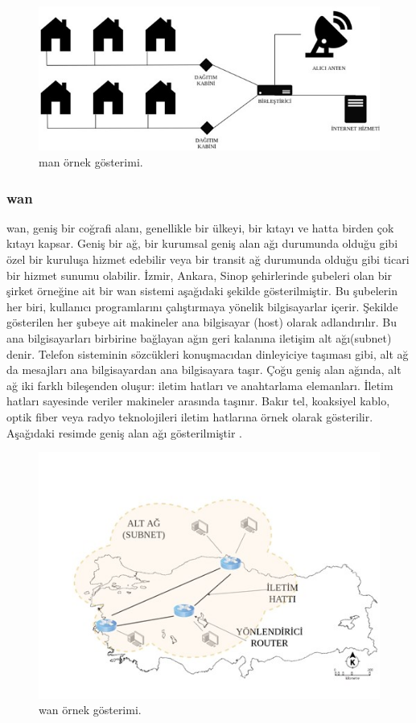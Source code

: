 \begin{figure}[htbp]
\centerline{\includegraphics[width=\columnwidth]{Resim/Sekil3-7.jpg}}
\caption{\gls{man} örnek gösterimi.}
\label{fig:figure13}
\end{figure}

\subsubsection{\gls{wan}}

\gls{wan}, geniş bir coğrafi alanı, genellikle bir ülkeyi, bir kıtayı ve hatta birden çok kıtayı kapsar. Geniş bir ağ, bir kurumsal geniş alan ağı durumunda olduğu gibi özel bir kuruluşa hizmet edebilir veya bir transit ağ durumunda olduğu gibi ticari bir hizmet sunumu olabilir.
İzmir, Ankara, Sinop şehirlerinde şubeleri olan bir şirket örneğine ait bir \gls{wan} sistemi aşağıdaki şekilde gösterilmiştir. Bu şubelerin her biri, kullanıcı programlarını çalıştırmaya yönelik bilgisayarlar içerir. Şekilde gösterilen her şubeye ait makineler ana bilgisayar (host) olarak adlandırılır. Bu ana bilgisayarları birbirine bağlayan ağın geri kalanına iletişim alt ağı(subnet) denir. Telefon sisteminin sözcükleri konuşmacıdan dinleyiciye taşıması gibi, alt ağ da mesajları ana bilgisayardan ana bilgisayara taşır.
Çoğu geniş alan ağında, alt ağ iki farklı bileşenden oluşur: iletim hatları ve anahtarlama elemanları. İletim hatları sayesinde veriler makineler arasında taşınır. Bakır tel, koaksiyel kablo, optik fiber veya radyo teknolojileri iletim hatlarına örnek olarak gösterilir. Aşağıdaki resimde geniş alan ağı gösterilmiştir \cite{tanenbaum2002computer}.

\begin{figure}[htbp]
\centerline{\includegraphics[width=12cm]{Resim/Sekil3-8.jpg}}
\caption{\gls{wan} örnek gösterimi.}
\label{fig:figure14}
\end{figure}


